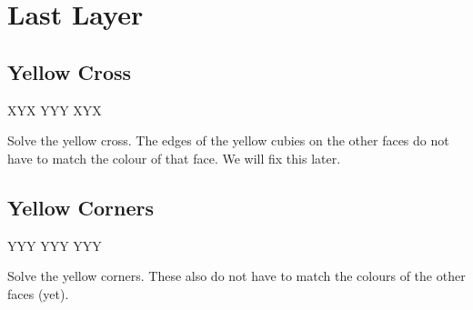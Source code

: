 \documentclass{article}
\begin{document}
    \section{Last Layer}

    \subsection{Yellow Cross}

    \RubikCubeGreyAll
    \RubikFaceUp XYX YYY XYX

    \begin{goal}[\DrawRubikFaceUp]
        Solve the yellow cross.
        The edges of the yellow cubies on the other faces do not have to match the colour of that face.
        We will fix this later.
    \end{goal}


    \subsection{Yellow Corners}
    \RubikCubeGreyAll
    \RubikFaceUp YYY YYY YYY

    \begin{goal}[\DrawRubikFaceUp]
        Solve the yellow corners.
        These also do not have to match the colours of the other faces (yet).
    \end{goal}
\end{document}
